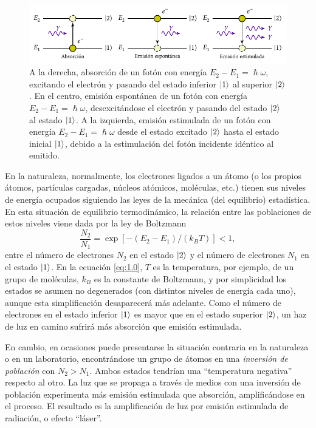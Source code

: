 \begin{figure}[htbp]
  \centering
  \includegraphics[width=\textwidth]{Figuras/ch1_rad_mat.pdf}
  \caption{A la derecha, absorción de un fotón con energía $E_{2} - E_{1} = \hslash \omega$, excitando el electrón y pasando del estado inferior $\left|1\right\rangle$ al superior $\left|2\right\rangle$. En el centro, emisión espontánea de un fotón con energía $E_{2}-E_{1}=\hslash \omega$, desexcitándose el electrón y pasando del estado $\left|2\right\rangle$ al estado $\left|1\right\rangle$. A la izquierda, emisión estimulada de un fotón con energía $E_{2}-E_{1}=\hslash \omega$ desde el estado excitado $\left|2\right\rangle$ hasta el estado inicial $\left|1\right\rangle$, debido a la estimulación del fotón incidente idéntico al emitido.}
  \label{fig:ch1_radmat}
\end{figure}

En la naturaleza, normalmente, los electrones ligados a un átomo (o los propios átomos, partículas cargadas, núcleos atómicos, moléculas, etc.) tienen sus niveles de energía ocupados siguiendo las leyes de la mecánica (del equilibrio) estadística. En esta situación de equilibrio termodinámico, la relación entre las poblaciones de estos niveles viene dada por la ley de Boltzmann \autocite{Feynman2011}
\begin{equation}\label{eq:1.0}
  \frac{N_{2}}{N_{1}} =  \exp \left[-(E_{2}-E_{1})/(k_{B}T)\right] < 1,
\end{equation}
entre el número de electrones $N_{2}$ en el estado $\left|2\right\rangle$ y el número de electrones $N_{1}$ en el estado $\left|1\right\rangle$. En la ecuación \eqref{eq:1.0}, $T$ es la temperatura, por ejemplo, de un grupo de moléculas, $k_{B}$ es la constante de Boltzmann, y por simplicidad los estados se asumen no degenerados (con distintos niveles de energía cada uno), aunque esta simplificación desaparecerá más adelante. Como el número de electrones en el estado inferior $\left|1\right\rangle$ es mayor que en el estado superior $\left|2\right\rangle$, un haz de luz en camino sufrirá más absorción que emisión estimulada.

En cambio, en ocasiones puede presentarse la situación contraria en la naturaleza o en un laboratorio, encontrándose un grupo de átomos en una \emph{inversión de población} con $N_{2} > N_{1}$. Ambos estados tendrían una \enquote{temperatura negativa} respecto al otro. La luz que se propaga a través de medios con una inversión de población experimenta más emisión estimulada que absorción, amplificándose en el proceso. El resultado es la amplificación de luz por emisión estimulada de radiación, o efecto \enquote{láser}.

